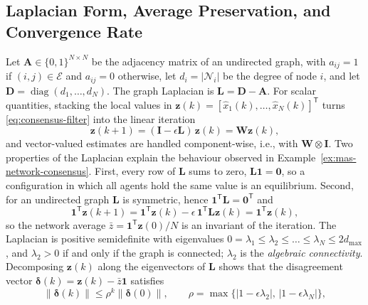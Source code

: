 \documentclass[graybox,envcountchap]{style/SNmono}
\DeclareMathOperator{\diag}{diag}
\begin{document}
\subsection{Laplacian Form, Average Preservation, and Convergence Rate}
\label{subsec:mas-laplacian}

Let $\mathbf{A}\in\{0,1\}^{N\times N}$ be the adjacency matrix of an undirected graph, with $a_{ij}=1$ if $(i,j)\in\mathcal{E}$ and $a_{ij}=0$ otherwise, let $d_i=|\mathcal{N}_i|$ be the degree of node $i$, and let $\mathbf{D}=\diag(d_1,\dots,d_N)$. The graph Laplacian is $\mathbf{L}=\mathbf{D}-\mathbf{A}$. For scalar quantities, stacking the local values in $\mathbf{z}(k)=[\widehat{x}_1(k),\dots,\widehat{x}_N(k)]^{\mathsf T}$ turns \eqref{eq:consensus-filter} into the linear iteration
\begin{equation}
\mathbf{z}(k+1)=(\mathbf{I}-\epsilon\mathbf{L})\,\mathbf{z}(k)=\mathbf{W}\mathbf{z}(k),
\label{eq:consensus-laplacian}
\end{equation}
and vector-valued estimates are handled component-wise, i.e., with $\mathbf{W}\otimes\mathbf{I}$. Two properties of the Laplacian explain the behaviour observed in Example~\ref{ex:mas-network-consensus}. First, every row of $\mathbf{L}$ sums to zero, $\mathbf{L}\mathbf{1}=\mathbf{0}$, so a configuration in which all agents hold the same value is an equilibrium. Second, for an undirected graph $\mathbf{L}$ is symmetric, hence $\mathbf{1}^{\mathsf T}\mathbf{L}=\mathbf{0}^{\mathsf T}$ and
\begin{equation}
\mathbf{1}^{\mathsf T}\mathbf{z}(k+1)=\mathbf{1}^{\mathsf T}\mathbf{z}(k)-\epsilon\,\mathbf{1}^{\mathsf T}\mathbf{L}\mathbf{z}(k)=\mathbf{1}^{\mathsf T}\mathbf{z}(k),
\label{eq:consensus-average-preserved}
\end{equation}
so the network average $\bar{z}=\mathbf{1}^{\mathsf T}\mathbf{z}(0)/N$ is an invariant of the iteration. The Laplacian is positive semidefinite with eigenvalues $0=\lambda_1\le\lambda_2\le\dots\le\lambda_N\le 2d_{\max}$, and $\lambda_2>0$ if and only if the graph is connected; $\lambda_2$ is the \emph{algebraic connectivity}. Decomposing $\mathbf{z}(k)$ along the eigenvectors of $\mathbf{L}$ shows that the disagreement vector $\boldsymbol{\delta}(k)=\mathbf{z}(k)-\bar{z}\mathbf{1}$ satisfies
\begin{equation}
\|\boldsymbol{\delta}(k)\|\le\rho^{k}\|\boldsymbol{\delta}(0)\|,\qquad
\rho=\max\{|1-\epsilon\lambda_2|,\,|1-\epsilon\lambda_N|\},
\label{eq:consensus-rate}
\end{equation}
\end{document}
